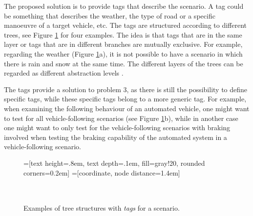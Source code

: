 The proposed solution is to provide tags that describe the scenario. A tag could be something that describes the weather, the type of road or a specific manoeuvre of a target vehicle, etc. The tags are structured according to different trees, see Figure \ref{fig:tag trees} for four examples. The idea is that tags that are in the same layer or tags that are in different branches are mutually exclusive. For example, regarding the weather (Figure \ref{fig:tag trees}a), it is not possible to have a scenario in which there is rain and snow at the same time. The different layers of the trees can be regarded as different abstraction levels \cite{Bonnin2014}. 

The tags provide a solution to problem 3, as there is still the possibility to define specific tags, while these specific tags belong to a more generic tag. For example, when examining the following behaviour of an automated vehicle, one might want to test for all vehicle-following scenarios (see Figure \ref{fig:tag trees}b), while in another case one might want to only test for the vehicle-following scenarios with braking involved when testing the braking capability of the automated system in a vehicle-following scenario.

\begin{figure}
	\begin{center}
		=[text height=.8em, text depth=.1em, fill=gray!20, rounded corners=0.2em]
		=[coordinate, node distance=1.4em]
		 \\
		\\
		 \\
		\caption{Examples of tree structures with \emph{tags} for a scenario.}
		\label{fig:tag trees}
	\end{center}
\end{figure}
